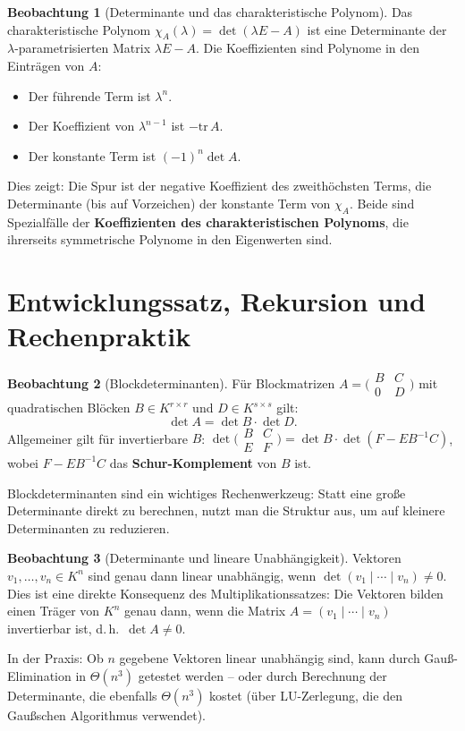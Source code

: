 ﻿\documentclass[a4paper,12pt]{report}
\theoremstyle{definition}
\newtheorem{beobachtung}{Beobachtung}
\begin{document}
\begin{beobachtung}[Determinante und das charakteristische Polynom]
    Das charakteristische Polynom $\chi_A(\lambda) = \det(\lambda E - A)$
    ist eine Determinante der $\lambda$-parametrisierten Matrix
    $\lambda E - A$. Die Koeffizienten sind Polynome in den
    Einträgen von $A$:
    \begin{itemize}
        \item[-] Der führende Term ist $\lambda^n$.
        \item[-] Der Koeffizient von $\lambda^{n-1}$ ist $-\mathrm{tr}\,A$.
        \item[-] Der konstante Term ist $(-1)^n \det A$.
    \end{itemize}
    Dies zeigt: Die Spur ist der negative Koeffizient des zweithöchsten
    Terms, die Determinante (bis auf Vorzeichen) der konstante Term von
    $\chi_A$. Beide sind Spezialfälle der \textbf{Koeffizienten
    des charakteristischen Polynoms}, die ihrerseits symmetrische
    Polynome in den Eigenwerten sind.
\end{beobachtung}


\section{Entwicklungssatz, Rekursion und Rechenpraktik}

\begin{beobachtung}[Blockdeterminanten]
    Für Blockmatrizen $A = \bigl(\begin{smallmatrix} B & C \\ 0 & D \end{smallmatrix}\bigr)$
    mit quadratischen Blöcken $B \in K^{r \times r}$ und $D \in K^{s \times s}$ gilt:
    \[
        \det A = \det B \cdot \det D.
    \]
    Allgemeiner gilt für invertierbare $B$:
    $\det\bigl(\begin{smallmatrix}B & C \\ E & F\end{smallmatrix}\bigr)
    = \det B \cdot \det(F - EB^{-1}C)$, wobei $F - EB^{-1}C$ das
    \textbf{Schur-Komplement} von $B$ ist.

    Blockdeterminanten sind ein wichtiges Rechenwerkzeug: Statt eine
    große Determinante direkt zu berechnen, nutzt man die Struktur
    aus, um auf kleinere Determinanten zu reduzieren.
\end{beobachtung}

\begin{beobachtung}[Determinante und lineare Unabhängigkeit]
    Vektoren $v_1, \ldots, v_n \in K^n$ sind genau dann linear unabhängig,
    wenn $\det(v_1 \mid \cdots \mid v_n) \neq 0$. Dies ist eine
    direkte Konsequenz des Multiplikationssatzes: Die Vektoren bilden
    einen Träger von $K^n$ genau dann, wenn die Matrix $A = (v_1 \mid \cdots \mid v_n)$
    invertierbar ist, d.\,h.\ $\det A \neq 0$.

    In der Praxis: Ob $n$ gegebene Vektoren linear unabhängig sind,
    kann durch Gauß-Elimination in $\Theta(n^3)$ getestet werden --
    oder durch Berechnung der Determinante, die ebenfalls $\Theta(n^3)$
    kostet (über LU-Zerlegung, die den Gaußschen Algorithmus verwendet).
\end{beobachtung}
\end{document}
